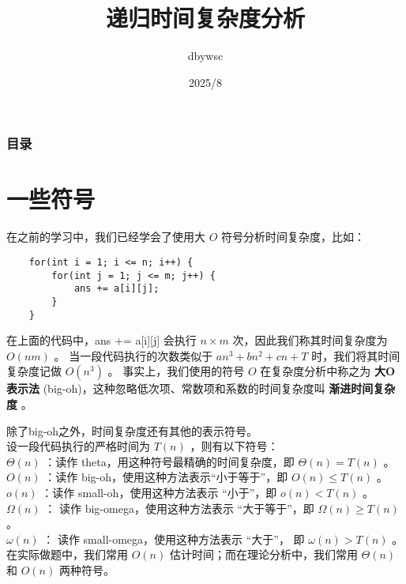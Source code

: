 \documentclass{beamer}
\title{递归时间复杂度分析}
\author{dbywsc}
\date{2025/8}
\newcommand{\fdf}[1]{\alert{\textbf{#1}}}
\begin{document}
\frame{\titlepage}
\begin{frame}
	\frametitle{目录}
	\tableofcontents
\end{frame}
\section{一些符号}
\begin{frame}[fragile]
在之前的学习中，我们已经学会了使用大 $O$ 符号分析时间复杂度，比如：
\begin{onlyenv}
\begin{verbatim}
    for(int i = 1; i <= n; i++) {
        for(int j = 1; j <= m; j++) {
            ans += a[i][j];
        }
    }
\end{verbatim}
\end{onlyenv}
在上面的代码中，ans += a[i][j] 会执行 $n \times m$ 次，因此我们称其时间复杂度为 $O(nm)$ 。
当一段代码执行的次数类似于 $an^3 + bn^2 + cn + T$ 时，我们将其时间复杂度记做 $O(n^3)$ 。
事实上，我们使用的符号 $O$ 在复杂度分析中称之为 \fdf{大O表示法} (big-oh)，这种忽略低次项、常数项和系数的时间复杂度叫 \fdf{渐进时间复杂度} 。
\end{frame}
\begin{frame}
除了big-oh之外，时间复杂度还有其他的表示符号。\\
设一段代码执行的严格时间为 $T(n)$ ，则有以下符号：\\
$\Theta(n)$ ：读作 theta，用这种符号最精确的时间复杂度，即 $\Theta(n) = T(n)$ 。 \\ 
$O(n)$ ：读作 big-oh，使用这种方法表示“小于等于”，即 $O(n) \leq T(n)$ 。 \\ 
$o(n)$ ：读作 small-oh，使用这种方法表示 “小于”，即 $o(n) < T(n)$ 。 \\ 
$\Omega(n)$ ： 读作 big-omega，使用这种方法表示 “大于等于”，即 $\Omega(n) \geq T(n)$ 。 \\ 
$\omega(n)$ ： 读作 small-omega，使用这种方法表示 “大于”， 即 $\omega(n) > T(n)$ 。
在实际做题中，我们常用 $O(n)$ 估计时间；而在理论分析中，我们常用 $\Theta(n)$ 和 $O(n)$ 两种符号。
\end{frame}
\end{document}
